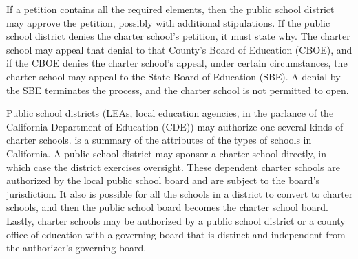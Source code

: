 If a petition contains all the required elements, then the public school district may approve the petition, possibly with additional stipulations. If the public school district denies the charter school's petition, it must state why. The charter school may appeal that denial to that County's Board of Education (CBOE), and if the CBOE denies the charter school's appeal, under certain circumstances, the charter school may appeal to the State Board of Education (SBE). A denial by the SBE terminates the process, and the charter school is not permitted to open.

Public school districts (LEAs, local education agencies, in the parlance of the California Department of Education (CDE)) may authorize one several kinds of charter schools.  is a summary of the attributes of the types of schools in California. A public school district may sponsor a charter school directly, in which case the district exercises oversight. These dependent charter schools are authorized by the local public school board and are subject to the board's jurisdiction. It also is possible for all the schools in a district to convert to charter schools, and then the public school board becomes the charter school board. Lastly, charter schools may be authorized by a public school district or a county office of education with a governing board that is distinct and independent from the authorizer's governing board.

